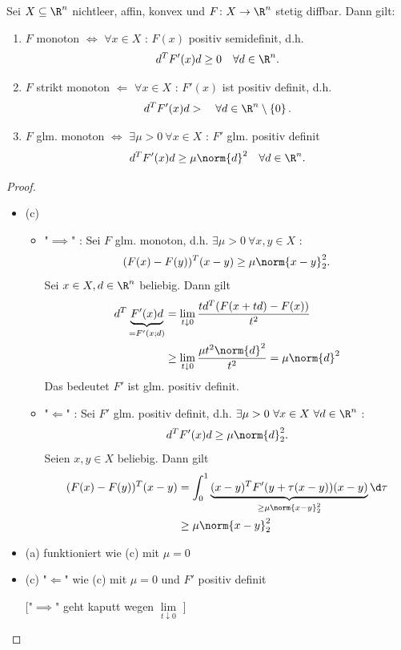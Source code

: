 \begin{satz}
\label{thm:monotonefunktionenunddefinitheit}
	Sei $X \subseteq \R^{n}$ nichtleer, affin, konvex und $F \colon X \rightarrow \R^{n} $ stetig diffbar. Dann gilt:
	\begin{enumerate}[label=(\alph{enumi})]
		\item $F$ monoton $\iff$ $\forall x \in X$ : $F(x)$ positiv semidefinit, d.h.
			\[
				d^{T}F'(x)d \geq 0 \quad \forall d \in \R^{n}
			.\] 
		\item $F$ strikt monoton $\Longleftarrow$ $\forall x \in X$ : $F'(x)$ ist positiv definit, d.h.
			\[
				d^{T}F'(x)d >  \quad \forall d \in \R^{n}\setminus \left\{ 0 \right\} 
			.\] 
		\item $F$ glm. monoton $\iff$ $\exists \mu > 0 ~ \forall x \in X$ : $F'$ glm. positiv definit
			\[
				d^{T} F'(x) d \geq \mu \norm{d} ^2 \quad \forall d \in \R^{n}
			.\]
	\end{enumerate}
\end{satz}

\begin{proof}
\label{thm:monotonefunktionenunddefinitheitbeweis}
\begin{itemize}
	\item (c)
		\begin{itemize}
			\item "$\implies$" : Sei $F$ glm. monoton, d.h. $\exists \mu > 0 ~ \forall x,y \in X$ : 
				\[
				(F(x)-F(y))^{T}(x-y) \geq \mu \norm{x-y} _{2}^2
				.\] 
				Sei $x \in X, d \in \R^{n}$ beliebig. Dann gilt
				\begin{align*}
					d^{T} \underbrace{F'(x)d}_{=F'(x;d)} &= \lim_{t \downarrow 0}  \frac{td^{T}(F(x+td) - F(x))}{t^2} \\
														 &\geq \lim_{t \downarrow 0}  \frac{\mu  t^2 \norm{d} ^2}{t^2} = \mu  \norm{d} ^2
				\end{align*}
				Das bedeutet $F'$ ist glm. positiv definit.

			\item "$\Longleftarrow$" : Sei $F'$ glm. positiv definit, d.h. $\exists \mu >0 ~ \forall x \in X ~ \forall d \in \R^{n}$ : 
				\[
					d^{T}F'(x)d \geq \mu \norm{d} _{2}^2
				.\] 
				Seien $x,y \in X$ beliebig. Dann gilt
				\begin{align*}
					(F(x)-F(y))^{T}(x-y) &= \int_{0}^{1} \underbrace{(x-y)^{T}F'(y+ \tau (x-y))(x-y)}_{\geq \mu \norm{x-y} _{2}^2} \d \tau \\
										 &\geq \mu  \norm{x-y} _{2}^2
				\end{align*}
		\end{itemize}
	\item (a) funktioniert wie (c) mit $\mu =0$
	\item (c) "$\Longleftarrow$" wie (c) mit $\mu =0$ und $F'$ positiv definit

		["$\implies$" geht kaputt wegen $\lim\limits_{t \downarrow 0}$ ]
\end{itemize}
\end{proof}

